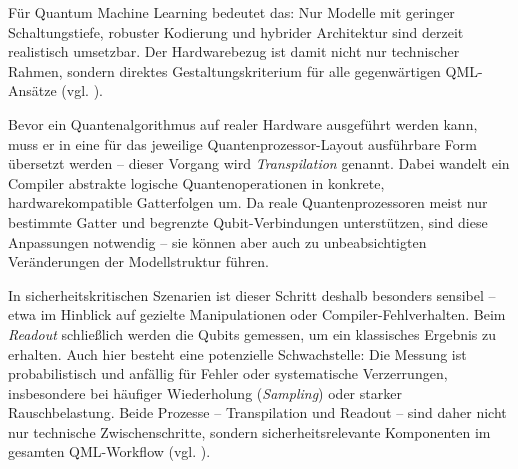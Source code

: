 Für Quantum Machine Learning bedeutet das: Nur Modelle mit geringer Schaltungstiefe, robuster Kodierung und hybrider Architektur sind derzeit realistisch umsetzbar. Der Hardwarebezug ist damit nicht nur technischer Rahmen, sondern direktes Gestaltungskriterium für alle gegenwärtigen QML-Ansätze (vgl. \cite{preskill_quantum_2018}).

\vspace{0.3cm}

Bevor ein Quantenalgorithmus auf realer Hardware ausgeführt werden kann, muss er in eine für das jeweilige Quantenprozessor-Layout ausführbare Form übersetzt werden – dieser Vorgang wird \textit{Transpilation} genannt. Dabei wandelt ein Compiler abstrakte logische Quantenoperationen in konkrete, hardwarekompatible Gatterfolgen um. Da reale Quantenprozessoren meist nur bestimmte Gatter und begrenzte Qubit-Verbindungen unterstützen, sind diese Anpassungen notwendig – sie können aber auch zu unbeabsichtigten Veränderungen der Modellstruktur führen.

In sicherheitskritischen Szenarien ist dieser Schritt deshalb besonders sensibel – etwa im Hinblick auf gezielte Manipulationen oder Compiler-Fehlverhalten. Beim \textit{Readout} schließlich werden die Qubits gemessen, um ein klassisches Ergebnis zu erhalten. Auch hier besteht eine potenzielle Schwachstelle: Die Messung ist probabilistisch und anfällig für Fehler oder systematische Verzerrungen, insbesondere bei häufiger Wiederholung (\textit{Sampling}) oder starker Rauschbelastung. Beide Prozesse – Transpilation und Readout – sind daher nicht nur technische Zwischenschritte, sondern sicherheitsrelevante Komponenten im gesamten QML-Workflow (vgl. \cite{willeIBMsQiskitTool2019}).




